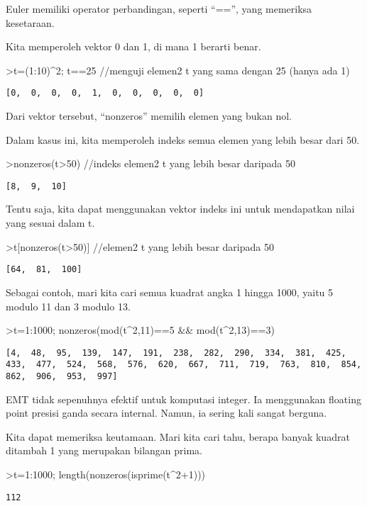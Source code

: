 \documentclass[
]{book}
\begin{document}
Euler memiliki operator perbandingan, seperti ``=='', yang memeriksa kesetaraan.

Kita memperoleh vektor 0 dan 1, di mana 1 berarti benar.

\textgreater t=(1:10)\^{}2; t==25 //menguji elemen2 t yang sama dengan 25 (hanya ada 1)

\begin{verbatim}
[0,  0,  0,  0,  1,  0,  0,  0,  0,  0]
\end{verbatim}

Dari vektor tersebut, ``nonzeros'' memilih elemen yang bukan nol.

Dalam kasus ini, kita memperoleh indeks semua elemen yang lebih besar dari 50.

\textgreater nonzeros(t\textgreater50) //indeks elemen2 t yang lebih besar daripada 50

\begin{verbatim}
[8,  9,  10]
\end{verbatim}

Tentu saja, kita dapat menggunakan vektor indeks ini untuk mendapatkan nilai yang sesuai dalam t.

\textgreater t{[}nonzeros(t\textgreater50){]} //elemen2 t yang lebih besar daripada 50

\begin{verbatim}
[64,  81,  100]
\end{verbatim}

Sebagai contoh, mari kita cari semua kuadrat angka 1 hingga 1000, yaitu 5 modulo 11 dan 3 modulo 13.

\textgreater t=1:1000; nonzeros(mod(t\^{}2,11)==5 \&\& mod(t\^{}2,13)==3)

\begin{verbatim}
[4,  48,  95,  139,  147,  191,  238,  282,  290,  334,  381,  425,
433,  477,  524,  568,  576,  620,  667,  711,  719,  763,  810,  854,
862,  906,  953,  997]
\end{verbatim}

EMT tidak sepenuhnya efektif untuk komputasi integer. Ia menggunakan floating point presisi ganda secara internal. Namun, ia sering kali sangat berguna.

Kita dapat memeriksa keutamaan. Mari kita cari tahu, berapa banyak kuadrat ditambah 1 yang merupakan bilangan prima.

\textgreater t=1:1000; length(nonzeros(isprime(t\^{}2+1)))

\begin{verbatim}
112
\end{verbatim}
\end{document}
